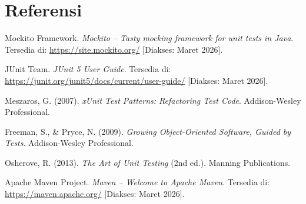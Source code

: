 \documentclass[12pt,a4paper]{article}
\begin{document}
\section*{Referensi}

\begin{enumerate}[label={[\arabic*]}]
    \item Mockito Framework. \textit{Mockito -- Tasty mocking framework for
          unit tests in Java}. Tersedia di: \url{https://site.mockito.org/}
          [Diakses: Maret 2026].

    \item JUnit Team. \textit{JUnit 5 User Guide}. Tersedia di:
          \url{https://junit.org/junit5/docs/current/user-guide/}
          [Diakses: Maret 2026].

    \item Meszaros, G. (2007). \textit{xUnit Test Patterns: Refactoring Test
          Code}. Addison-Wesley Professional.

    \item Freeman, S., \& Pryce, N. (2009). \textit{Growing Object-Oriented
          Software, Guided by Tests}. Addison-Wesley Professional.

    \item Osherove, R. (2013). \textit{The Art of Unit Testing} (2nd ed.).
          Manning Publications.

    \item Apache Maven Project. \textit{Maven -- Welcome to Apache Maven}.
          Tersedia di: \url{https://maven.apache.org/}
          [Diakses: Maret 2026].
\end{enumerate}
\end{document}
